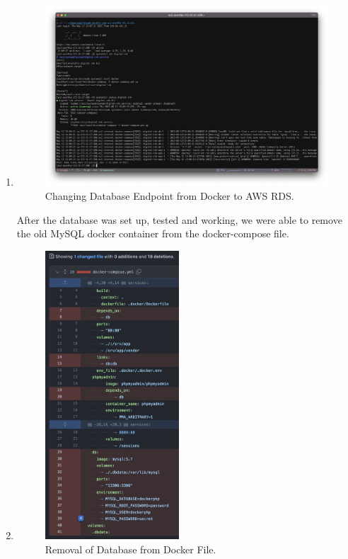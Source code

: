\begin{enumerate}
    \item
    \begin{figure}[H]
        \centering
        \includegraphics[width=\textwidth]{resources/rds/envupdate}
        \caption{Changing Database Endpoint from Docker to AWS RDS.}
        \label{fig:rds-env-update}
    \end{figure}

    After the database was set up, tested and working, we were able to remove the old MySQL docker container from the
    docker-compose file.

    \item 
    \begin{figure}[H]
        \centering
        \includegraphics[width=50mm]{resources/rds/docker}
        \caption{Removal of Database from Docker File.}
        \label{fig:rds-rm-docker-compose}
    \end{figure}
\end{enumerate}